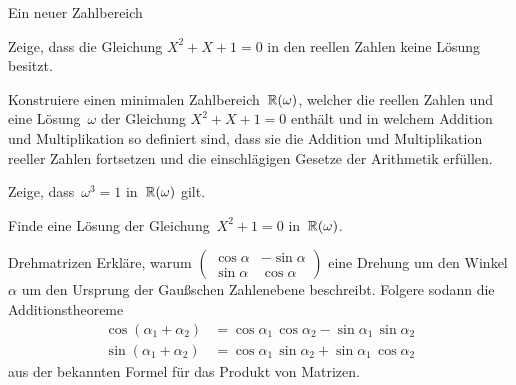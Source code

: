 \documentclass{algblatt}
\begin{document}
\newpage
\begin{aufgabeE}{Ein neuer Zahlbereich}
\item
Zeige, dass die Gleichung $X^2 + X + 1 = 0$ in den reellen Zahlen
keine Lösung besitzt.
\item
Konstruiere einen minimalen Zahlbereich~$\mathbb{R}(\omega)$, welcher die
reellen Zahlen und eine Lösung~$\omega$ der Gleichung $X^2 + X + 1 = 0$
enthält und in welchem Addition und Multiplikation so definiert sind, dass sie
die Addition und Multiplikation reeller Zahlen fortsetzen und die
einschlägigen Gesetze der Arithmetik erfüllen.
\item Zeige, dass~$\omega^3 = 1$ in~$\mathbb{R}(\omega)$ gilt.
\item Finde eine Lösung der Gleichung~$X^2 + 1 = 0$ in~$\mathbb{R}(\omega)$.
\end{aufgabeE}

\begin{aufgabe}{Drehmatrizen}
Erkläre, warum \(\left(\begin{smallmatrix}
                           \cos \alpha & - \sin \alpha\\
                           \sin \alpha & \cos \alpha
                       \end{smallmatrix}\right)\) eine Drehung um den Winkel \(\alpha\) um
den Ursprung der Gaußschen Zahlenebene beschreibt. Folgere sodann
die Additionstheoreme
\begin{align*}
    \cos (\alpha_1 + \alpha_2) & = \cos \alpha_1 \, \cos \alpha_2
        - \sin \alpha_1 \, \sin \alpha_2
    \\
    \sin (\alpha_1 + \alpha_2) & = \cos \alpha_1 \, \sin \alpha_2
        + \sin \alpha_1 \, \cos \alpha_2
\end{align*}
aus der bekannten Formel für das Produkt von Matrizen.
\end{aufgabe}
\end{document}
